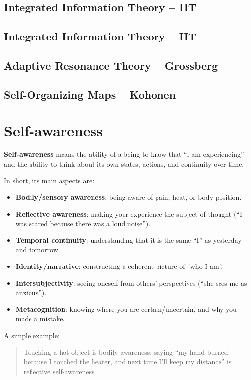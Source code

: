     \subsection{Integrated Information Theory – IIT}
    \subsection{Integrated Information Theory – IIT}
    \subsection{Adaptive Resonance Theory – Grossberg}
    \subsection{Self-Organizing Maps – Kohonen}
    
    
    
\section{Self-awareness}
    \noindent
    \textbf{Self-awareness} means the ability of a being to know that ``I am experiencing'' and the ability to think about its own states, actions, and continuity over time.
    
    \medskip
    \noindent
    In short, its main aspects are:
    \begin{itemize}
        \item \textbf{Bodily/sensory awareness}: being aware of pain, heat, or body position.
        \item \textbf{Reflective awareness}: making your experience the subject of thought (``I was scared because there was a loud noise'').
        \item \textbf{Temporal continuity}: understanding that it is the same ``I'' as yesterday and tomorrow.
        \item \textbf{Identity/narrative}: constructing a coherent picture of ``who I am''.
        \item \textbf{Intersubjectivity}: seeing oneself from others’ perspectives (``she sees me as anxious'').
        \item \textbf{Metacognition}: knowing where you are certain/uncertain, and why you made a mistake.
    \end{itemize}
    
    \noindent
    A simple example:
    \begin{quote}
        Touching a hot object is bodily awareness; saying ``my hand burned because I touched the heater, and next time I’ll keep my distance'' is reflective self-awareness.
    \end{quote}
    
    
    
    
    

    
    
    
    